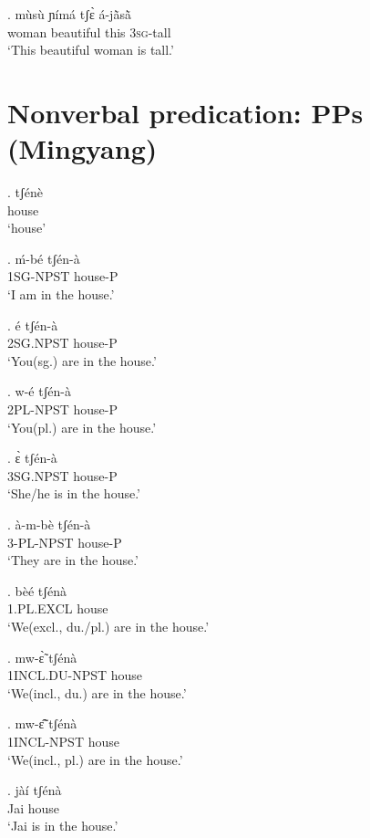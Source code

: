 \documentclass{assets/fieldnotes}
\begin{document}
{\exg. mùsù ɲímá tʃɛ̀ á-jã̀sã̀\\
woman beautiful this \textsc{3sg}-tall\\
`This beautiful woman is tall.'




\section{Nonverbal predication: PPs (Mingyang)} 
\exg. tʃénè\\
    house\\
    `house'

\exg. ḿ-bé tʃén-à\\
    1SG-NPST house-P\\
    `I am in the house.'

   
\exg. é tʃén-à\\
    2SG.NPST house-P\\
    `You(sg.) are in the house.'

\exg. w-é tʃén-à\\
    2PL-NPST house-P\\
    `You(pl.) are in the house.'

\exg. ɛ̀ tʃén-à\\
    3SG.NPST house-P\\
    `She/he is in the house.'

\exg. à-m-bè tʃén-à\\
    3-PL-NPST house-P\\
    `They are in the house.'

\exg. bèé tʃénà\\
    1.PL.EXCL house\\
    `We(excl., du./pl.) are in the house.'

\exg. mw-ɛ̃̀  tʃénà\\
    1INCL.DU-NPST house\\
    `We(incl., du.) are in the house.'

\exg. mw-ɛ̃̂  tʃénà\\
    1INCL-NPST house\\
    `We(incl., pl.) are in the house.'

\exg. jàí tʃénà\\
    Jai house\\
    `Jai is in the house.'


}
\end{document}
